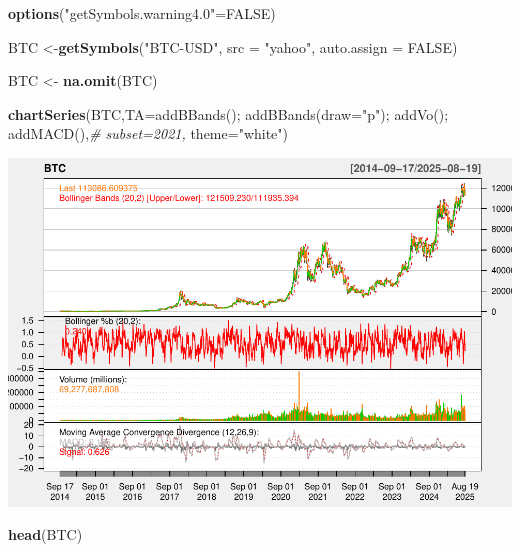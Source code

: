 \documentclass[
]{book}
\newenvironment{Shaded}{\begin{snugshade}}{\end{snugshade}}
\newcommand{\AttributeTok}[1]{\textcolor[rgb]{0.13,0.29,0.53}{#1}}
\newcommand{\CommentTok}[1]{\textcolor[rgb]{0.56,0.35,0.01}{\textit{#1}}}
\newcommand{\ConstantTok}[1]{\textcolor[rgb]{0.56,0.35,0.01}{#1}}
\newcommand{\FunctionTok}[1]{\textcolor[rgb]{0.13,0.29,0.53}{\textbf{#1}}}
\newcommand{\NormalTok}[1]{#1}
\newcommand{\OtherTok}[1]{\textcolor[rgb]{0.56,0.35,0.01}{#1}}
\newcommand{\StringTok}[1]{\textcolor[rgb]{0.31,0.60,0.02}{#1}}
\begin{document}
\begin{Shaded}
\begin{Highlighting}[]
\FunctionTok{options}\NormalTok{(}\StringTok{"getSymbols.warning4.0"}\OtherTok{=}\ConstantTok{FALSE}\NormalTok{)}

\NormalTok{BTC }\OtherTok{\textless{}{-}}\FunctionTok{getSymbols}\NormalTok{(}\StringTok{"BTC{-}USD"}\NormalTok{, }\AttributeTok{src =} \StringTok{"yahoo"}\NormalTok{, }\AttributeTok{auto.assign =} \ConstantTok{FALSE}\NormalTok{)}

\NormalTok{BTC }\OtherTok{\textless{}{-}} \FunctionTok{na.omit}\NormalTok{(BTC)}

\FunctionTok{chartSeries}\NormalTok{(BTC,}\AttributeTok{TA=}\StringTok{\textquotesingle{}addBBands();}
\StringTok{                    addBBands(draw="p");}
\StringTok{                    addVo();}
\StringTok{                    addMACD()\textquotesingle{}}\NormalTok{,}\CommentTok{\# subset=\textquotesingle{}2021\textquotesingle{},}
                \AttributeTok{theme=}\StringTok{"white"}\NormalTok{)}
\end{Highlighting}
\end{Shaded}

\includegraphics{Notas-Series-Tiempo_files/figure-latex/Data_ARCH-1.pdf}

\begin{Shaded}
\begin{Highlighting}[]
\FunctionTok{head}\NormalTok{(BTC)}
\end{Highlighting}
\end{Shaded}
\end{document}
